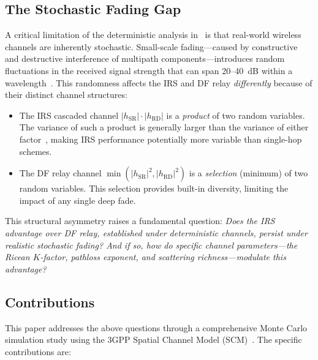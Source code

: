 \documentclass[journal]{IEEEtran} %
\begin{document}
\subsection{The Stochastic Fading Gap}

A critical limitation of the deterministic analysis in~\cite{bjornson2020irs} is that real-world wireless channels are inherently stochastic. Small-scale fading---caused by constructive and destructive interference of multipath components---introduces random fluctuations in the received signal strength that can span 20--40~dB within a wavelength~\cite{tse2005fundamentals}. This randomness affects the IRS and DF relay \textit{differently} because of their distinct channel structures:

\begin{itemize}[leftmargin=*]
    \item The IRS cascaded channel $|h_{\mathrm{SR}}| \cdot |h_{\mathrm{RD}}|$ is a \textit{product} of two random variables. The variance of such a product is generally larger than the variance of either factor~\cite{simon2005digital}, making IRS performance potentially more variable than single-hop schemes.

    \item The DF relay channel $\min(|h_{\mathrm{SR}}|^2, |h_{\mathrm{RD}}|^2)$ is a \textit{selection} (minimum) of two random variables. This selection provides built-in diversity, limiting the impact of any single deep fade.
\end{itemize}

This structural asymmetry raises a fundamental question: \textit{Does the IRS advantage over DF relay, established under deterministic channels, persist under realistic stochastic fading? And if so, how do specific channel parameters---the Ricean $K$-factor, pathloss exponent, and scattering richness---modulate this advantage?}

\subsection{Contributions}

This paper addresses the above questions through a comprehensive Monte Carlo simulation study using the 3GPP Spatial Channel Model (SCM)~\cite{etsi125996}. The specific contributions are:
\end{document}

